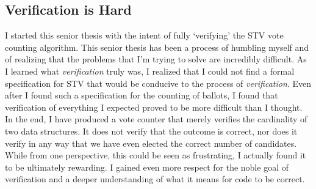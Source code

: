 \subsection{Verification is Hard}

I started this senior thesis with the intent of fully `verifying' the STV vote
counting algorithm. This senior thesis has been a process of humbling myself and
of realizing that the problems that I'm trying to solve are incredibly
difficult. As I learned what \textit{verification} truly was, I realized that I
could not find a formal specification for STV that would be conducive to the
process of \textit{verification}. Even after I found such a specification for
the counting of ballots, I found that verification of everything I expected
proved to be more difficult than I thought. In the end, I have produced a vote
counter that merely verifies the cardinality of two data structures. It does not
verify that the outcome is correct, nor does it verify in any way that we have
even elected the correct number of candidates. While from one perspective, this
could be seen as frustrating, I actually found it to be ultimately rewarding. I
gained even more respect for the noble goal of verification and a deeper
understanding of what it means for code to be correct. 